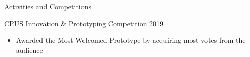 \documentclass{article}
\newlength{\tabin}
\newlength{\secsep}
\newcommand{\lineunder}{\vspace*{-8pt} \\ \hspace*{-6pt} \hrulefill \\ \vspace*{-15pt}}
\newenvironment{tabbedsection}[1]{
  \begin{list}{}{
      \setlength{\itemsep}{0pt}
      \setlength{\labelsep}{0pt}
      \setlength{\labelwidth}{0pt}
      \setlength{\leftmargin}{\tabin}
      \setlength{\rightmargin}{\tabin}
      \setlength{\listparindent}{0pt}
      \setlength{\parsep}{0pt}
      \setlength{\parskip}{0pt}
      \setlength{\partopsep}{0pt}
      \setlength{\topsep}{#1}
    }
  \item[]
}{\end{list}}
\newenvironment{resume_section}[1]{
  \filbreak
  \vspace{2\secsep}
  \textsc{\large#1}
  \lineunder
  \begin{tabbedsection}{\secsep}
}{\end{tabbedsection}}
\newenvironment{resume_subsection}[2][]{
  \textbf{#2} \hfill {\footnotesize #1} \hspace{2em}
  \begin{tabbedsection}{0.5\secsep}
}{\end{tabbedsection}}
\newenvironment{subitems}{
  \renewcommand{\labelitemi}{-}
  \begin{itemize}
      \setlength{\labelsep}{1em}
}{\end{itemize}}
\begin{document}
\begin{resume_section}{Activities and Competitions}

  \begin{resume_subsection}[(March 2019)]{CPUS Innovation \& Prototyping Competition 2019}
    \begin{subitems}
      \item Awarded the Most Welcomed Prototype by acquiring most votes from the audience
    \end{subitems}
  \end{resume_subsection}
\end{resume_section}
\end{document}

